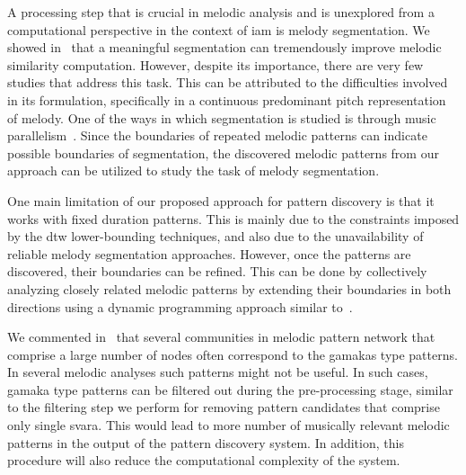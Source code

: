 A processing step that is crucial in melodic analysis and is unexplored from a computational perspective in the context of \gls{iam} is melody segmentation. We showed in~ that a meaningful segmentation can tremendously improve melodic similarity computation. However, despite its importance, there are very few studies that address this task. This can be attributed to the difficulties involved in its formulation, specifically in a continuous predominant pitch representation of melody. One of the ways in which segmentation is studied is through music parallelism~\citep{Cambouropoulos2006,rodriguez2014comparing}. Since the boundaries of repeated melodic patterns can indicate possible boundaries of segmentation, the discovered melodic patterns from our approach can be utilized to study the task of melody segmentation.   

One main limitation of our proposed approach for pattern discovery is that it works with fixed duration patterns. This is mainly due to the constraints imposed by the \gls{dtw} lower-bounding techniques, and also due to the unavailability of reliable melody segmentation approaches. However, once the patterns are discovered, their boundaries can be refined. This can be done by collectively analyzing closely related melodic patterns by extending their boundaries in both directions using a dynamic programming approach similar to~\cite{muscariello2009variability}.

We commented in~ that several communities in melodic pattern network that comprise a large number of nodes often correspond to the \glspl{gamaka} type patterns. In several melodic analyses such patterns might not be useful. In such cases, \gls{gamaka} type patterns can be filtered out during the pre-processing stage, similar to the filtering step we perform for removing pattern candidates that comprise only single \gls{svara}. This would lead to more number of musically relevant melodic patterns in the output of the pattern discovery system. In addition, this procedure will also reduce the computational complexity of the system.

